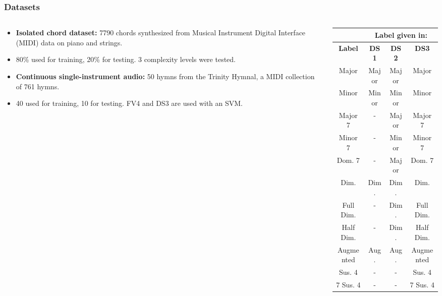 \documentclass{beamer}
\begin{document}
\begin{frame}
	\frametitle{Datasets}
	\begin{columns}
	\begin{column}{.6\textwidth}
	\begin{itemize}
	\item \textbf{Isolated chord dataset:} 7790 chords synthesized from Musical Instrument Digital Interface (MIDI) data on piano and strings. 
	\item 80\% used for training, 20\% for testing. 3 complexity levels were tested.
 	\item \textbf{Continuous single-instrument audio:} 50 hymns from the Trinity Hymnal, a MIDI collection of 761 hymns.
 	\item 40 used for training, 10 for testing. FV4 and DS3 are used with an SVM.
	\end{itemize}
	\end{column}
	\begin{column}{.4\textwidth}
	\begin{table}
	\tiny
\centering
\begin{tabular}{|c|c|c|c|} \hline
&\multicolumn{3}{|c|}{\textbf{Label given in:}} \\ \hline
\textbf{Label} & \textbf{DS1} & \textbf{DS2} & \textbf{DS3} \\ \hline
Major & Major & Major & Major \\ \hline
Minor & Minor & Minor & Minor \\ \hline
Major 7 & - & Major & Major 7 \\ \hline
Minor 7 & - & Minor & Minor 7 \\ \hline
Dom. 7 & - & Major & Dom. 7 \\ \hline
Dim. & Dim. & Dim. & Dim. \\ \hline
Full Dim. & - & Dim. & Full Dim. \\ \hline
Half Dim. & - & Dim. & Half Dim. \\ \hline
Augmented & Aug. & Aug. & Augmented \\ \hline
Sus. 4 & - & - & Sus. 4 \\ \hline
7 Sus. 4 & - & - & 7 Sus. 4 \\ \hline
\end{tabular}
\label{tab:tab1}
\end{table} 
\end{column}
\end{columns}
\end{frame}  
\end{document}
